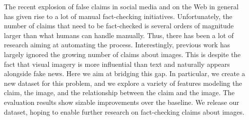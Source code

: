The recent explosion of false claims in social media and on the Web in general has given rise to a lot of manual fact-checking initiatives. Unfortunately, the number of claims that need to be fact-checked is several orders of magnitude larger than what humans can handle manually. Thus, there has been a lot of research aiming at automating the process.  Interestingly, previous work has largely ignored the growing number of claims about images. This is despite the fact that visual imagery is more influential than text and naturally appears alongside fake news. Here we aim at bridging this gap. In particular, we create a new dataset for this problem, and we explore a variety of features modeling the claim, the image, and the relationship between the claim and the image. The evaluation results show sizable improvements over the baseline. We release our dataset, hoping to enable further research on fact-checking claims about images.